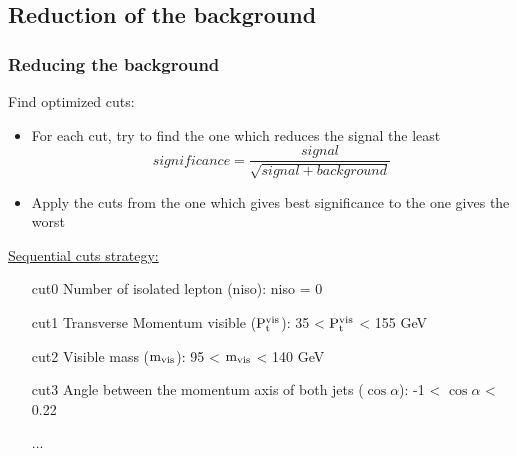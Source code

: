 \documentclass{beamer}
\begin{document}
  \subsection{Reduction of the background}
\begin{frame}
  \frametitle{Reducing the background}
    
  \vspace{-0.25cm}
  \begin{block}{Find optimized cuts:}
      \begin{itemize}
          \item For each cut, try to find the one which reduces the signal the least
              \[significance = \frac{signal}{\sqrt{signal + background}}\]
          \item Apply the cuts from the one which gives best significance to the one gives the worst
      \end{itemize}
  \end{block}

  \vspace{-0.2cm}
  \begin{exampleblock}{\hyperlink{cuts}{Sequential cuts strategy:}}
      \begin{enumerate}
          \item [cut0] Number of isolated lepton (niso): niso = 0 %
          \item [cut1] Transverse Momentum visible ($\rm{P_{t}^{vis}}$): 35 < $\rm{P_{t}^{vis}}$ < 155 GeV
          \item [cut2] Visible mass ($\rm{m_{vis}}$): 95 < $\rm{m_{vis}}$ < 140 GeV
          \item [cut3] Angle between the momentum axis of both jets ($\cos{\alpha}$): -1 < $\cos{\alpha}$ < 0.22
          \vspace{-0.1cm}
          \item [...]
      \end{enumerate}
  \end{exampleblock}

\end{frame}
\end{document}

